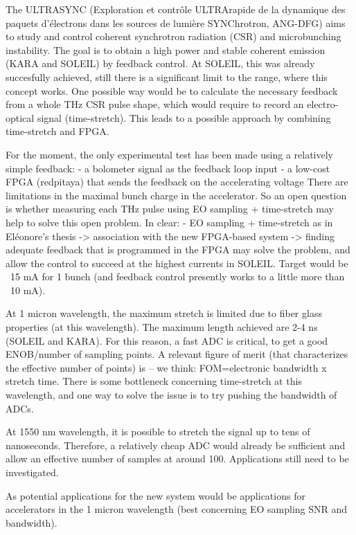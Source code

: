 The ULTRASYNC (Exploration et contrôle ULTRArapide de la dynamique des paquets d'électrons dans les sources de lumière SYNChrotron, ANG-DFG) aims to study and control coherent synchrotron radiation (CSR) and microbunching instability. The goal is to obtain a high power and stable coherent emission (KARA and SOLEIL) by feedback control. At SOLEIL, this was already succesfully achieved, still there is a significant limit to the range, where this concept works. One possible way would be to calculate the necessary feedback from a whole THz CSR pulse shape, which would require to record an electro-optical signal (time-stretch). This leads to a possible approach by combining time-stretch and FPGA. 

For the moment, the only experimental test has been made using a relatively simple feedback:
- a bolometer signal as the feedback loop input
- a low-cost FPGA (redpitaya) that sends the feedback on the accelerating voltage
There are limitations in the maximal bunch charge in the accelerator. So an open question is whether measuring each THz pulse using EO sampling + time-stretch may help to solve this open problem. In clear:
- EO sampling + time-stretch as in Eléonore's thesis
-> association with the new FPGA-based system
-> finding adequate feedback that is programmed in the FPGA
may solve the problem, and allow the control to succeed at the highest currents in SOLEIL. 
Target would be ~15 mA for 1 bunch (and feedback control presently works to a little more than ~10 mA).

At 1 micron wavelength, the maximum stretch is limited due to fiber glass properties (at this wavelength). The maximum length achieved are 2-4 ns (SOLEIL and KARA). For this reason, a fast ADC is critical, to get a good ENOB/number of sampling points. A relevant figure of merit (that characterizes the effective number of points) is -- we think: FOM=electronic bandwidth x stretch time. There is some bottleneck concerning time-stretch at this wavelength, and one way to solve the issue is to try pushing the bandwidth of ADCs.

At 1550 nm wavelength, it is possible to stretch the signal up to tens of nanoseconds. Therefore, a relatively cheap ADC would already be sufficient and allow an effective number of samples at around 100. Applications still need to be investigated.

As potential applications for the new system would be applications for accelerators in the 1 micron wavelength (best concerning EO sampling SNR and bandwidth).

